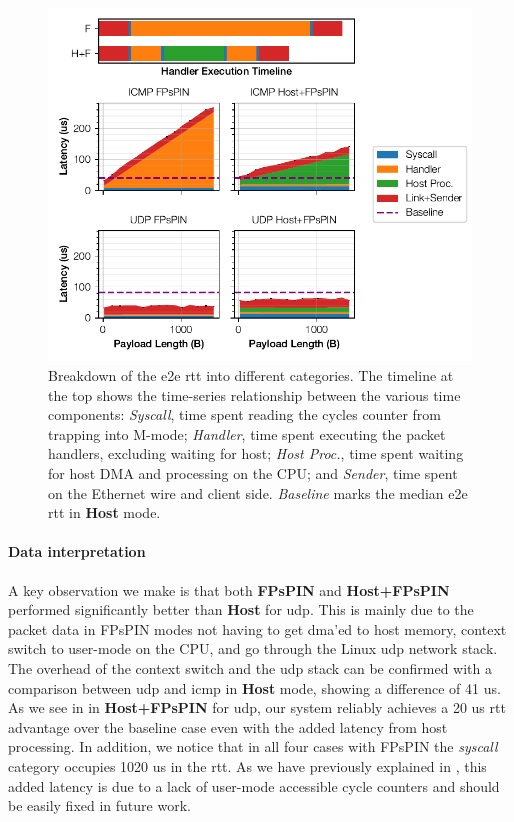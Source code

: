 \begin{figure}[tp]
    \centering
    \includegraphics{thesis/figures/pingpong-breakdown.pdf}
    \caption{Breakdown of the \ac{e2e} \ac{rtt} into different categories.  The timeline at the top shows the time-series relationship between the various time components: \emph{Syscall}, time spent reading the cycles counter from trapping into M-mode; \emph{Handler}, time spent executing the packet handlers, excluding waiting for host; \emph{Host Proc.}, time spent waiting for host DMA and processing on the CPU; and \emph{Sender}, time spent on the Ethernet wire and client side.  \emph{Baseline} marks the median \ac{e2e} \ac{rtt} in \textbf{Host} mode.} \label{fig:pingpong-breakdown}
\end{figure}

\paragraph{Data interpretation} A key observation we make is that both \textbf{FPsPIN} and \textbf{Host+FPsPIN} performed significantly better than \textbf{Host} for \ac{udp}.  This is mainly due to the packet data in FPsPIN modes not having to get \ac{dma}'ed to host memory, context switch to user-mode on the CPU, and go through the Linux \ac{udp} network stack.  The overhead of the context switch and the \ac{udp} stack can be confirmed with a comparison between \ac{udp} and \ac{icmp} in \textbf{Host} mode, showing a difference of \mytilde{}41 us.  As we see in  in \textbf{Host+FPsPIN} for \ac{udp}, our system reliably achieves a \mytilde{}20 us \ac{rtt} advantage over the baseline case even with the added latency from host processing.  In addition, we notice that in all four cases with FPsPIN the \emph{syscall} category occupies 10\mytilde{}20 us in the \ac{rtt}.  As we have previously explained in , this added latency is due to a lack of user-mode accessible cycle counters and should be easily fixed in future work.

